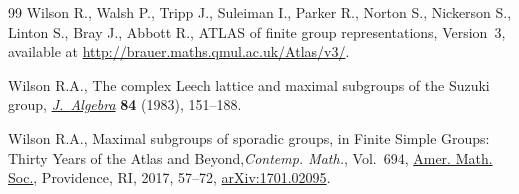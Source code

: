 \documentclass[pdftex]{sigma}
\numberwithin{equation}{section}
\newcommand\<\langle
\renewcommand\>\rangle
\begin{document}
\begin{thebibliography}{99}
Wilson R., Walsh P., Tripp J., Suleiman I., Parker R., Norton S., Nickerson S.,
 Linton S., Bray J., Abbott R., {ATLAS} of finite group representations,
 Version~3, available at \url{http://brauer.maths.qmul.ac.uk/Atlas/v3/}.

Wilson R.A., The complex {L}eech lattice and maximal subgroups of the {S}uzuki
 group, \href{https://doi.org/10.1016/0021-8693(83)90074-1}{\textit{J.~Algebra}} \textbf{84} (1983), 151--188.

Wilson R.A., Maximal subgroups of sporadic groups, in Finite Simple Groups:
 Thirty Years of the Atlas and Beyond,\textit{Contemp. Math.}, Vol.~694,
 \href{https://doi.org/10.1090/conm/694}{Amer. Math. Soc.}, Providence, RI, 2017, 57--72, \href{https://arxiv.org/abs/1701.02095}{arXiv:1701.02095}.

\end{thebibliography}\LastPageEnding
\end{document}

